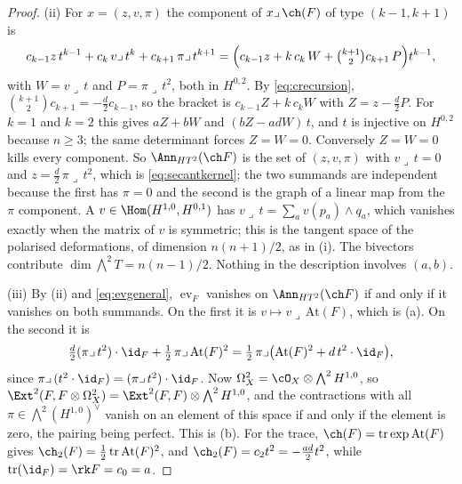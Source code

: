 \begin{proof}
(ii) For $x=(z,v,\pi)$ the component of $x\lrcorner\,\ch(F)$ of type
$(k-1,k+1)$ is
\[
  c_{k-1}z\,t^{k-1}+c_{k}\,v\lrcorner\,t^{k}+c_{k+1}\,\pi\lrcorner\,t^{k+1}
  =\Bigl(c_{k-1}z+k\,c_{k}\,W+\tbinom{k+1}{2}c_{k+1}\,P\Bigr)t^{k-1},
\]
with $W=v\lrcorner\,t$ and $P=\pi\lrcorner\,t^{2}$, both in $H^{0,2}$. By
\eqref{eq:crecursion}, $\binom{k+1}{2}c_{k+1}=-\tfrac d2c_{k-1}$, so the bracket
is $c_{k-1}Z+k\,c_{k}W$ with $Z=z-\tfrac d2P$. For $k=1$ and $k=2$ this gives
$aZ+bW$ and $(bZ-adW)\,t$, and $t$ is injective on $H^{0,2}$ because $n\ge3$;
the same determinant forces $Z=W=0$. Conversely $Z=W=0$ kills every
component. So $\Ann_{HT^{2}}(\ch F)$ is the set of $(z,v,\pi)$ with
$v\lrcorner\,t=0$ and $z=\tfrac d2\,\pi\lrcorner\,t^{2}$, which is
\eqref{eq:secantkernel}; the two summands are independent because the first
has $\pi=0$ and the second is the graph of a linear map from the $\pi$
component. A $v\in\Hom(H^{1,0},H^{0,1})$ has $v\lrcorner\,t=\sum_{a}v(p_{a})\wedge q_{a}$,
which vanishes exactly when the matrix of $v$ is symmetric; this is the
tangent space of the polarised deformations, of dimension $n(n+1)/2$, as in
(i). The bivectors contribute
$\dim\bigwedge^{2}T=n(n-1)/2$. Nothing in the description involves $(a,b)$.

(iii) By (ii) and \eqref{eq:evgeneral}, $\operatorname{ev}_{F}$ vanishes on
$\Ann_{HT^{2}}(\ch F)$ if and only if it vanishes on both summands. On the
first it is $v\mapsto v\lrcorner\,\mathrm{At}(F)$, which is (a). On the
second it is
\[
  \tfrac d2(\pi\lrcorner\,t^{2})\cdot\id_{F}+\tfrac12\,\pi\lrcorner\,\mathrm{At}(F)^{2}
  =\tfrac12\,\pi\lrcorner\bigl(\mathrm{At}(F)^{2}+d\,t^{2}\cdot\id_{F}\bigr),
\]
since $\pi\lrcorner\,(t^{2}\cdot\id_{F})=(\pi\lrcorner\,t^{2})\cdot\id_{F}$.
Now $\Omega^{2}_{X}=\cO_{X}\otimes\bigwedge^{2}H^{1,0}$, so
$\Ext^{2}(F,F\otimes\Omega^{2}_{X})=\Ext^{2}(F,F)\otimes\bigwedge^{2}H^{1,0}$,
and the contractions with all $\pi\in\bigwedge^{2}(H^{1,0})^{\vee}$ vanish on
an element of this space if and only if the element is zero, the pairing
being perfect. This is (b). For the trace, $\ch(F)=\operatorname{tr}\exp\mathrm{At}(F)$
gives $\ch_{2}(F)=\tfrac12\operatorname{tr}\mathrm{At}(F)^{2}$, and
$\ch_{2}(F)=c_{2}t^{2}=-\tfrac{ad}{2}t^{2}$, while
$\operatorname{tr}(\id_{F})=\rk F=c_{0}=a$.


\end{proof}
